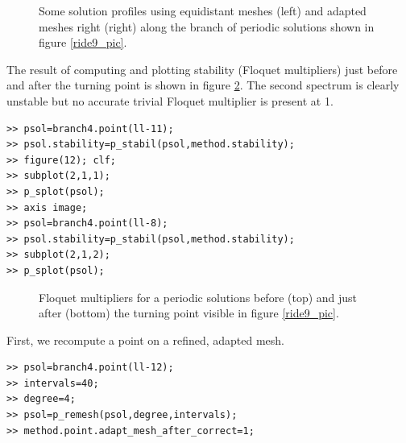 \documentclass[10pt]{article}
\begin{document}
{\begin{figure}[h]
\begin{center}
\end{center}
\caption{\small\label{ride10+13_pic}Some solution profiles
using equidistant meshes (left) and adapted meshes right (right) 
along the branch of periodic solutions 
shown in figure \ref{ride9_pic}.} 
\end{figure}
The result of computing and plotting stability (Floquet multipliers) 
just before
and after the turning point is shown in figure \ref{ride12_pic}. 
The second spectrum is clearly unstable but no accurate trivial
Floquet multiplier is present at 1. 
{\small\begin{verbatim}
>> psol=branch4.point(ll-11);
>> psol.stability=p_stabil(psol,method.stability);
>> figure(12); clf;
>> subplot(2,1,1);
>> p_splot(psol);
>> axis image;
>> psol=branch4.point(ll-8);
>> psol.stability=p_stabil(psol,method.stability);
>> subplot(2,1,2);
>> p_splot(psol);
\end{verbatim}}
\begin{figure}[h]
\begin{center}
\end{center}
\caption{\small\label{ride12_pic}Floquet multipliers for
a periodic solutions before (top) and just after (bottom)
the turning point visible in figure \ref{ride9_pic}.}
\end{figure}
First, we recompute a point on a refined, adapted mesh.
{\small\begin{verbatim}
>> psol=branch4.point(ll-12);
>> intervals=40;
>> degree=4;
>> psol=p_remesh(psol,degree,intervals);
>> method.point.adapt_mesh_after_correct=1;

\end{verbatim}}}
\end{document}

